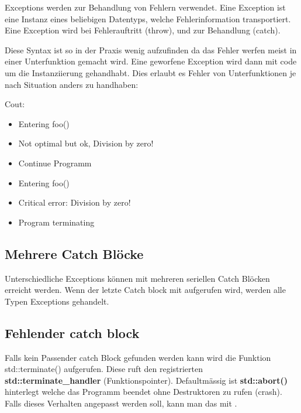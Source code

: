 Exceptions werden zur Behandlung von Fehlern verwendet. 
Eine Exception ist eine Instanz eines beliebigen Datentyps, welche Fehlerinformation transportiert. 
Eine Exception wird bei Fehlerauftritt  (throw), und zur Behandlung  (catch).




Diese Syntax ist so in der Praxis wenig aufzufinden da das Fehler werfen meist in einer Unterfunktion gemacht wird. 
Eine geworfene Exception wird dann mit code um die Instanziierung gehandhabt. 
Dies erlaubt es Fehler von Unterfunktionen je nach Situation anders zu handhaben:



Cout:

\begin{itemize}[itemsep=1pt, parsep=0pt]
    \item Entering foo()
    \item Not optimal but ok, Division by zero!
    \item Continue Programm
    \item Entering foo()
    \item Critical error: Division by zero!
    \item Program terminating
\end{itemize}

\subsection{Mehrere Catch Blöcke}

Unterschiedliche Exceptions können mit mehreren seriellen Catch Blöcken erreicht werden. 
Wenn der letzte Catch block mit  aufgerufen wird, werden alle Typen Exceptions gehandelt. 

\nextcol



\subsection{Fehlender catch block}

Falls kein Passender catch Block gefunden werden kann wird die Funktion std::terminate() aufgerufen. 
Diese ruft den registrierten \textbf{std::terminate\_handler} (Funktionspointer). 
Defaultmässig ist \textbf{std::abort()} hinterlegt welche das Programm beendet ohne Destruktoren zu rufen (crash).
Falls dieses Verhalten angepasst werden soll, kann man das mit .

